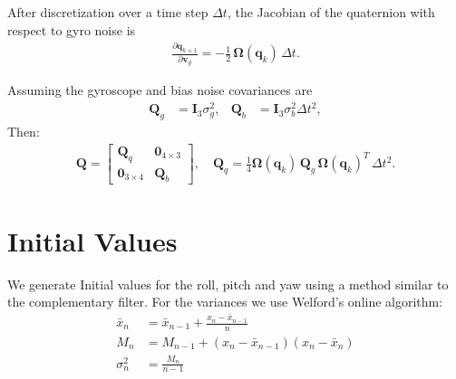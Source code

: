\documentclass[10pt,a4paper]{article}
\begin{document}
After discretization over a time step $\Delta t$, the Jacobian of the quaternion with respect to gyro noise is
\begin{align}
  \frac{\partial \mathbf{q}_{k+1}}{\partial \mathbf{v}_g} = -\frac{1}{2} \, \boldsymbol{\Omega}(\mathbf{q}_k) \, \Delta t.
\end{align}

Assuming the gyroscope and bias noise covariances are
\begin{align}
  \mathbf{Q}_g &= \mathbf{I}_3 \sigma_g^2, &
  \mathbf{Q}_b &= \mathbf{I}_3 \sigma_b^2 \Delta t^2,
\end{align}
Then: 
\begin{align}
  \mathbf{Q} =
  \begin{bmatrix}
    \mathbf{Q}_q & \mathbf{0}_{4\times3} \\[1mm]
    \mathbf{0}_{3\times4} & \mathbf{Q}_b
  \end{bmatrix}, \quad
  \mathbf{Q}_q = \frac{1}{4} \boldsymbol{\Omega}(\mathbf{q}_k) \, \mathbf{Q}_g \, \boldsymbol{\Omega}(\mathbf{q}_k)^T \, \Delta t^2.
\end{align}



\section{Initial Values}
We generate Initial values for the roll, pitch and yaw using a method similar to the complementary filter.
For the variances we use Welford's online algorithm:
\begin{align}
  \bar x_n &= \bar x_{n-1} + \frac {x_n - \bar x_{n-1}} n \\
  M_n &= M_{n-1} + (x_n - \bar x_{n-1}) (x_n - \bar x_n) \\
  \sigma_n^2 &= \frac {M_n} {n-1}
\end{align}
\end{document}
